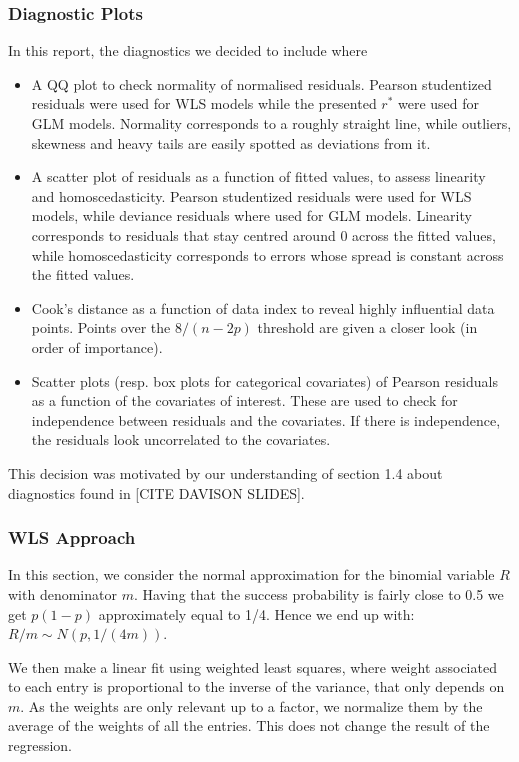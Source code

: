\documentclass[a4paper, 12pt,oneside]{article}
\begin{document}
			\subsubsection{Diagnostic Plots}
				In this report, the diagnostics we decided to include where 
				\begin{itemize}
					\item A QQ plot to check normality of normalised residuals. Pearson studentized residuals were used for WLS models while the presented $r^*$ were used for GLM models. Normality corresponds to a roughly straight line, while outliers, skewness and heavy tails are easily spotted as deviations from it.
					\item A scatter plot of residuals as a function of fitted values, to assess linearity and homoscedasticity. Pearson studentized residuals were used for WLS models, while deviance residuals where used for GLM models. Linearity corresponds to residuals that stay centred around 0 across the fitted values, while homoscedasticity corresponds to errors whose spread is constant across the fitted values.
					\item Cook's distance as a function of data index to reveal highly influential data points. Points over the $8/(n-2p)$ threshold are given a closer look (in order of importance). 
					\item Scatter plots (resp. box plots for categorical covariates) of Pearson residuals as a function of the covariates of interest. These are used to check for independence between residuals and the covariates. If there is independence, the residuals look uncorrelated to the covariates. 
				\end{itemize}
				This decision was motivated by our understanding of section 1.4 about diagnostics found in [CITE DAVISON SLIDES]. 
			\subsubsection{WLS Approach}
			In this section, we consider the normal approximation for the binomial variable $R$ with denominator $m$. Having that the success probability is fairly close to 0.5 we get $p(1-p)$ approximately equal to 1/4. Hence we end up with: $R/m \sim N(p,1/(4m))$. 

			We then make a linear fit using weighted least squares, where  weight associated to each entry is proportional to the inverse of the variance, that only depends on $m$. As the weights are only relevant up to a factor,  we normalize them by the average of the weights of all the entries. This does not change the result of the regression. 
\end{document}
